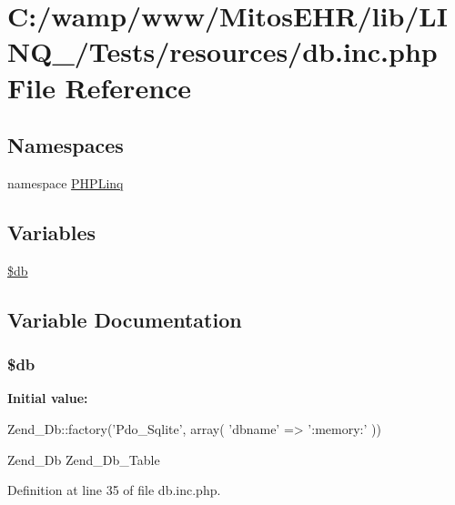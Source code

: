 \hypertarget{db_8inc_8php}{\section{\-C\-:/wamp/www/\-Mitos\-E\-H\-R/lib/\-L\-I\-N\-Q\-\_/\-Tests/resources/db.inc.\-php \-File \-Reference}
\label{db_8inc_8php}
}
\subsection*{\-Namespaces}
\begin{DoxyCompactItemize}
\item 
namespace \hyperlink{namespace_p_h_p_linq}{\-P\-H\-P\-Linq}
\end{DoxyCompactItemize}
\subsection*{\-Variables}
\begin{DoxyCompactItemize}
\item 
\hyperlink{db_8inc_8php_a1fa3127fc82f96b1436d871ef02be319}{\$db}
\end{DoxyCompactItemize}


\subsection{\-Variable \-Documentation}
\hypertarget{db_8inc_8php_a1fa3127fc82f96b1436d871ef02be319}{
\subsubsection[{\$db}]{\setlength{\rightskip}{0pt plus 5cm}\$db}}\label{db_8inc_8php_a1fa3127fc82f96b1436d871ef02be319}
{\bfseries \-Initial value\-:}
\begin{DoxyCode}
 Zend_Db::factory('Pdo_Sqlite', array(
    'dbname'   => ':memory:'
))
\end{DoxyCode}
\-Zend\-\_\-\-Db \-Zend\-\_\-\-Db\-\_\-\-Table 

\-Definition at line 35 of file db.\-inc.\-php.

